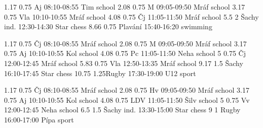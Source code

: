 \documentclass[a4paper,10pt]{report}
\begin{document}
\begin{landscape}
\begin{timetable}
  
   {1.17} {0.75} {Aj}                {08:10-08:55}        {Tim}     {school}
   {2.08} {0.75} {M}                 {09:05-09:50}        {Mráf}     {school}
   {3.17} {0.75} {Vla}               {10:10-10:55}        {Mráf}     {school}
   {4.08} {0.75} {Čj}                {11:05-11:50}        {Mráf}     {school}
   {5.5} {2}     {Šachy ind.}        {12:30-14:30}        {Star}     {chess}
   {8.66} {0.75} {Plavání}           {15:40-16:20}        {}     {swimming}

   {1.17} {0.75} {Čj}                 {08:10-08:55}        {Mráf}     {school}
   {2.08} {0.75} {M}                  {09:05-09:50}        {Mráf}     {school}
   {3.17} {0.75} {Aj}                 {10:10-10:55}        {Kol}     {school}
   {4.08} {0.75} {Pc}                 {11:05-11:50}        {Neha}     {school}
   {5} {0.75}    {Čj}                 {12:00-12:45}        {Mráf}     {school}
   {5.83} {0.75} {Vla}                {12:50-13:35}        {Mráf}     {school}
   {9.17} {1.5}  {Šachy}              {16:10-17:45}        {Star}     {chess}
   {10.75} {1.25}{Rugby}              {17:30-19:00}        {U12}     {sport}

   {1.17} {0.75} {Čj}                 {08:10-08:55}        {Mráf}     {school}
   {2.08} {0.75} {Hv}                 {09:05-09:50}        {Mráf}     {school}
   {3.17} {0.75} {Aj}                 {10:10-10:55}        {Kol}     {school}
   {4.08} {0.75} {LDV}                {11:05-11:50}        {Šilv}     {school}
   {5} {0.75}    {Vv}                 {12:00-12:45}        {Neha}     {school} 
   {6.5} {1.5}   {Šachy ind.}         {13:30-15:00}        {Star}     {chess}
   {9} {1}       {Rugby}              {16:00-17:00}        {Pípa}     {sport}
  
\end{timetable}
\end{landscape}
\end{document}
